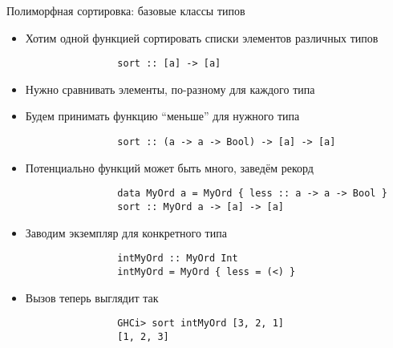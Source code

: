 

    \begin{frame}[fragile]{Полиморфная сортировка: базовые классы типов}
        \begin{itemize}
            \item Хотим одной функцией сортировать списки элементов различных типов
            \begin{verbatim}
                sort :: [a] -> [a]
            \end{verbatim}
            \item Нужно сравнивать элементы, по-разному для каждого типа
            \item[\then] Будем принимать функцию ``меньше'' для нужного типа
            \begin{verbatim}
                sort :: (a -> a -> Bool) -> [a] -> [a]
            \end{verbatim}
            \item Потенциально функций может быть много, заведём рекорд
            \begin{verbatim}
                data MyOrd a = MyOrd { less :: a -> a -> Bool }
                sort :: MyOrd a -> [a] -> [a]
            \end{verbatim}
            \item Заводим экземпляр для конкретного типа
            \begin{verbatim}
                intMyOrd :: MyOrd Int
                intMyOrd = MyOrd { less = (<) }
            \end{verbatim}
            \item Вызов теперь выглядит так
            \begin{verbatim}
                GHCi> sort intMyOrd [3, 2, 1]
                [1, 2, 3]
            \end{verbatim}
        \end{itemize}
    \end{frame}

